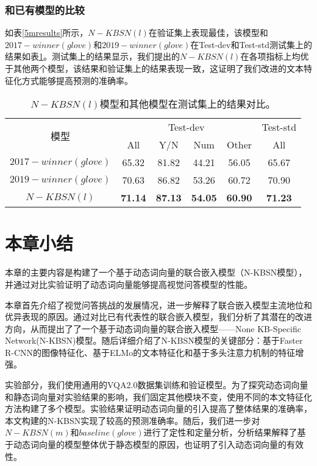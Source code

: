 \subsubsection{和已有模型的比较}
如表\ref{5mresults}所示，$N-KBSN(l)$在验证集上表现最佳，该模型和$2017-winner(glove)$和$2019-winner(glove)$在Test-dev和Test-std测试集上的结果如表\ref{testres}。测试集上的结果显示，我们提出的$N-KBSN(l)$在各项指标上均优于其他两个模型，该结果和验证集上的结果表现一致，这证明了我们改进的文本特征化方式能够提高预测的准确率。
\begin{table}[H]
\centering
\caption{$N-KBSN(l)$模型和其他模型在测试集上的结果对比。}
\begin{tabular}{c|cccc|c}
\toprule
\multirow{2}{*}{模型} & \multicolumn{4}{c}{Test-dev} & Test-std\\
& All & Y/N & Num & Other & All \\
\midrule
$2017-winner(glove)$ & 65.32 & 81.82 & 44.21 & 56.05 & 65.67\\
$2019-winner(glove)$ & 70.63 & 86.82 & 53.26 & 60.72 & 70.90\\
\midrule
$N-KBSN(l)$& \textbf{71.14} & \textbf{87.13} & \textbf{54.05} & \textbf{60.90} & \textbf{71.23} \\
\bottomrule
\end{tabular}
\label{testres}
\end{table}

\section{本章小结}
本章的主要内容是构建了一个基于动态词向量的联合嵌入模型（N-KBSN模型），并通过对比实验证明了动态词向量能够提高视觉问答模型的性能。

本章首先介绍了视觉问答挑战的发展情况，进一步解释了联合嵌入模型主流地位和优异表现的原因。通过对比已有代表性的联合嵌入模型，我们分析了其潜在的改进方向，从而提出了了一个基于动态词向量的联合嵌入模型——None KB-Specific Network(N-KBSN)模型。随后详细介绍了N-KBSN模型的关键部分：基于Faster R-CNN的图像特征化、基于ELMo的文本特征化和基于多头注意力机制的特征增强。

实验部分，我们使用通用的VQA2.0数据集训练和验证模型。为了探究动态词向量和静态词向量对实验结果的影响，我们固定其他模块不变，使用不同的本文特征化方法构建了多个模型。实验结果证明动态词向量的引入提高了整体结果的准确率，本文构建的N-KBSN实现了较高的预测准确率。随后，我们进一步对$N-KBSN(m)$和$baseline(glove)$进行了定性和定量分析，分析结果解释了基于动态词向量的模型整体优于静态模型的原因，也证明了引入动态词向量的有效性。




